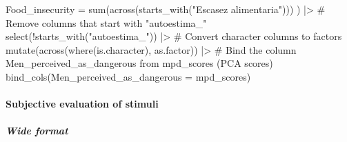 \documentclass[
  bookmarksnumbered]{article}
\newenvironment{Shaded}{\begin{snugshade}}{\end{snugshade}}
\newcommand{\AttributeTok}[1]{\textcolor[rgb]{0.80,0.80,0.80}{#1}}
\newcommand{\CommentTok}[1]{\textcolor[rgb]{0.50,0.62,0.50}{#1}}
\newcommand{\FunctionTok}[1]{\textcolor[rgb]{0.94,0.94,0.56}{#1}}
\newcommand{\NormalTok}[1]{\textcolor[rgb]{0.80,0.80,0.80}{#1}}
\newcommand{\SpecialCharTok}[1]{\textcolor[rgb]{0.86,0.64,0.64}{#1}}
\newcommand{\StringTok}[1]{\textcolor[rgb]{0.80,0.58,0.58}{#1}}
\begin{document}
\begin{Shaded}
\begin{Highlighting}[]
    \AttributeTok{Food\_insecurity =} \FunctionTok{sum}\NormalTok{(}\FunctionTok{across}\NormalTok{(}\FunctionTok{starts\_with}\NormalTok{(}\StringTok{"Escasez alimentaria"}\NormalTok{)))}
\NormalTok{  ) }\SpecialCharTok{|\textgreater{}}
  \CommentTok{\# Remove columns that start with "autoestima\_"}
  \FunctionTok{select}\NormalTok{(}\SpecialCharTok{!}\FunctionTok{starts\_with}\NormalTok{(}\StringTok{"autoestima\_"}\NormalTok{)) }\SpecialCharTok{|\textgreater{}}
  \CommentTok{\# Convert character columns to factors}
  \FunctionTok{mutate}\NormalTok{(}\FunctionTok{across}\NormalTok{(}\FunctionTok{where}\NormalTok{(is.character), as.factor)) }\SpecialCharTok{|\textgreater{}}
  \CommentTok{\# Bind the column \textquotesingle{}Men\_perceived\_as\_dangerous\textquotesingle{} from \textquotesingle{}mpd\_scores\textquotesingle{} (PCA scores)}
  \FunctionTok{bind\_cols}\NormalTok{(}\AttributeTok{Men\_perceived\_as\_dangerous =}\NormalTok{ mpd\_scores)}
\end{Highlighting}
\end{Shaded}

\paragraph{Subjective evaluation of stimuli}\label{subjective-evaluation-of-stimuli}

\subparagraph{Wide format}\label{wide-format}
\end{document}
